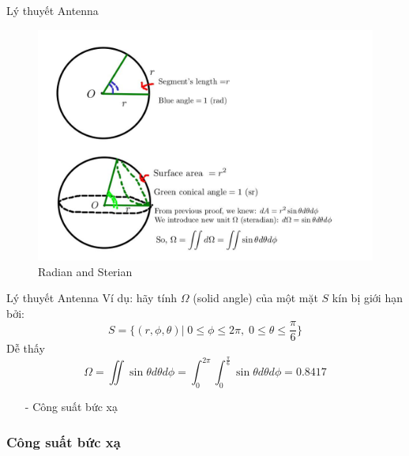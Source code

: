 \documentclass[8pt]{beamer}
\begin{document}
\begin{frame}{Lý thuyết Antenna}
\begin{figure}[h]
\includegraphics[width=1\textwidth]{sterian.jpg}
\caption{Radian and Sterian}
\end{figure}

\end{frame}
\begin{frame}{Lý thuyết Antenna}
	Ví dụ: hãy tính $\Omega$ (solid angle) của một mặt $S$ kín bị giới hạn bởi: $$S=\{(r,\phi,\theta )|\; 0\leq \phi\leq 2\pi,\;0\leq\theta\leq\frac{\pi}{6}\}$$
	Dễ thấy $$\Omega=\iint\sin{\theta}d\theta d\phi=\int_{0}^{2\pi}\int_{0}^{\frac{\pi}{6}}\sin{\theta}d\theta d\phi=0.8417$$
\begin{itemize}
	\item[-] Công suất bức xạ
\end{itemize}
\subsubsection{Công suất bức xạ}
\end{frame}
\end{document}
